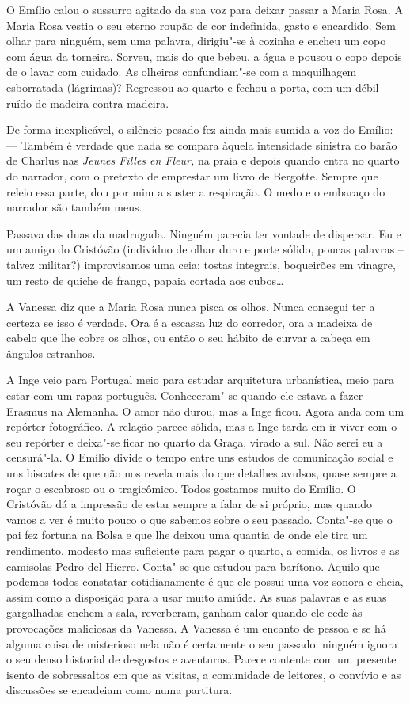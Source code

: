 O Emílio calou o sussurro agitado da sua voz para deixar passar a Maria
Rosa. A Maria Rosa vestia o seu eterno roupão de cor indefinida, gasto e
encardido. Sem olhar para ninguém, sem uma palavra, dirigiu"-se à cozinha
e encheu um copo com água da torneira. Sorveu, mais do que bebeu, a água
e pousou o copo depois de o lavar com cuidado. As olheiras confundiam"-se com a maquilhagem esborratada (lágrimas)? Regressou ao quarto e
fechou a porta, com um débil ruído de madeira contra madeira.

De forma inexplicável, o silêncio pesado fez ainda mais sumida a voz do
Emílio: --- Também é verdade que nada se compara àquela intensidade
sinistra do barão de Charlus nas \emph{Jeunes Filles en Fleur, }na praia
e depois quando entra no quarto do narrador, com o pretexto de emprestar
um livro de
Bergotte. Sempre que releio essa parte, dou por mim a suster a
respiração. O medo e o embaraço do narrador são também meus.

Passava das duas da madrugada. Ninguém parecia ter vontade de dispersar.
Eu e um amigo do Cristóvão (indivíduo de olhar duro e porte sólido,
poucas palavras -- talvez militar?) improvisamos uma ceia: tostas
integrais, boqueirões em vinagre, um resto de quiche de frango, papaia
cortada aos cubos\ldots{}

A Vanessa diz que a Maria Rosa nunca pisca os olhos. Nunca consegui ter
a certeza se isso é verdade. Ora é a escassa luz do corredor, ora a
madeixa de cabelo que lhe cobre os olhos, ou então o seu hábito de
curvar a cabeça em ângulos estranhos.

\medskip
\asterisc
\medskip


A Inge veio para Portugal meio para estudar arquitetura urbanística,
meio para estar com um rapaz português. Conheceram"-se quando ele
estava a fazer Erasmus na Alemanha. O amor não durou, mas a Inge ficou.
Agora anda com um repórter fotográfico. A relação parece sólida, mas a
Inge tarda em ir viver com o seu repórter e deixa"-se ficar no quarto da
Graça, virado a sul. Não serei eu a censurá"-la. O Emílio divide o tempo
entre uns estudos de comunicação social e uns biscates de que não nos
revela mais do que detalhes avulsos, quase sempre a roçar o escabroso ou
o tragicômico. Todos gostamos muito do Emílio. O Cristóvão dá a
impressão de estar sempre a falar de si próprio, mas quando vamos a ver
é muito pouco o que sabemos sobre o seu passado. Conta"-se que o pai fez fortuna
na Bolsa e que lhe deixou uma quantia de onde ele tira um rendimento,
modesto mas suficiente para pagar o quarto, a comida, os livros e as
camisolas Pedro del Hierro. Conta"-se que estudou para barítono. Aquilo
que podemos todos constatar cotidianamente é que ele possui uma voz
sonora e cheia, assim como a disposição para a usar muito amiúde. As
suas palavras e as suas gargalhadas enchem a sala, reverberam, ganham
calor quando ele cede às provocações maliciosas da Vanessa. A Vanessa é
um encanto de pessoa e se há alguma coisa de misterioso nela não é
certamente o seu passado: ninguém ignora o seu denso historial de
desgostos e aventuras. Parece contente com um presente isento de sobressaltos em que as visitas, a comunidade de leitores, o convívio e as
discussões se encadeiam como numa partitura.

